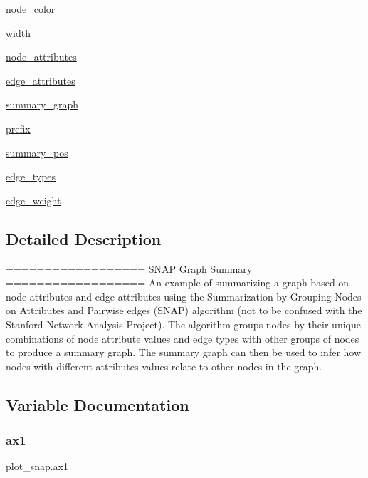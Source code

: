 \begin{DoxyCompactItemize}
\hyperlink{namespaceplot__snap_ab83b5155d058b60fe2102be3d3da4532}{node\+\_\+color}
\item 
\hyperlink{namespaceplot__snap_a88b481a3717503b9c7b3bbae73889760}{width}
\item 
\hyperlink{namespaceplot__snap_a3ea0546f78ef8227405863da783a8283}{node\+\_\+attributes}
\item 
\hyperlink{namespaceplot__snap_a2d65144cf896591616773d3a73f42feb}{edge\+\_\+attributes}
\item 
\hyperlink{namespaceplot__snap_a8b966cf636d460bc2bc46c3c1030fdaf}{summary\+\_\+graph}
\item 
\hyperlink{namespaceplot__snap_a77cd78cb1c3f1b43a3deb95377b28a0d}{prefix}
\item 
\hyperlink{namespaceplot__snap_ac43f700d400bd54c69ba5804dbecfea2}{summary\+\_\+pos}
\item 
\hyperlink{namespaceplot__snap_aff06bd64ba327608abae435e650ecd46}{edge\+\_\+types}
\item 
\hyperlink{namespaceplot__snap_a8f5f4db9f4f7358a8a6176c35b78aa01}{edge\+\_\+weight}
\end{DoxyCompactItemize}


\subsection{Detailed Description}
\begin{DoxyVerb}==================
SNAP Graph Summary
==================
An example of summarizing a graph based on node attributes and edge attributes
using the Summarization by Grouping Nodes on Attributes and Pairwise
edges (SNAP) algorithm (not to be confused with the Stanford Network
Analysis Project).  The algorithm groups nodes by their unique
combinations of node attribute values and edge types with other groups
of nodes to produce a summary graph.  The summary graph can then be used to
infer how nodes with different attributes values relate to other nodes in the
graph.
\end{DoxyVerb}
 

\subsection{Variable Documentation}
\mbox{\label{namespaceplot__snap_a1c3018eead7d1820f702a4ce7144aea2}} 
\subsubsection{\texorpdfstring{ax1}{ax1}}
{\footnotesize\ttfamily plot\+\_\+snap.\+ax1}

